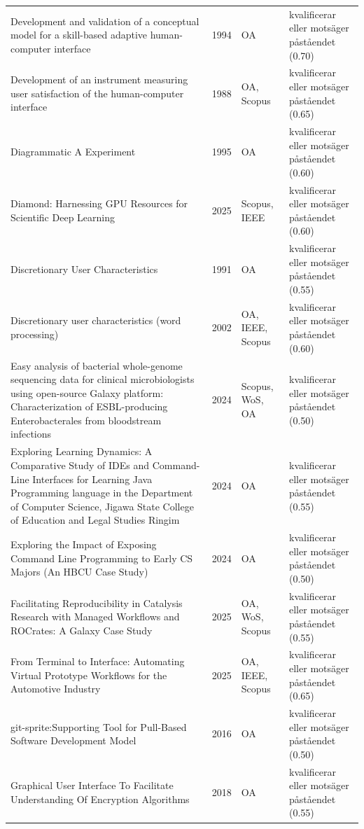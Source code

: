 \begin{longtable}{@{}%
  >{\raggedright\arraybackslash}p{}c%
  >{\raggedright\arraybackslash}p{}%
  >{\raggedright\arraybackslash}p{}@{}}
Development and validation of a conceptual model for a skill-based adaptive human-computer interface & 1994 & OA & kvalificerar eller motsäger påståendet (0.70) \\
Development of an instrument measuring user satisfaction of the human-computer interface & 1988 & OA, Scopus & kvalificerar eller motsäger påståendet (0.65) \\
Diagrammatic A Experiment & 1995 & OA & kvalificerar eller motsäger påståendet (0.60) \\
Diamond: Harnessing GPU Resources for Scientific Deep Learning & 2025 & Scopus, IEEE & kvalificerar eller motsäger påståendet (0.60) \\
Discretionary User Characteristics & 1991 & OA & kvalificerar eller motsäger påståendet (0.55) \\
Discretionary user characteristics (word processing) & 2002 & OA, IEEE, Scopus & kvalificerar eller motsäger påståendet (0.60) \\
Easy analysis of bacterial whole-genome sequencing data for clinical microbiologists using open-source Galaxy platform: Characterization of ESBL-producing Enterobacterales from bloodstream infections & 2024 & Scopus, WoS, OA & kvalificerar eller motsäger påståendet (0.50) \\
Exploring Learning Dynamics: A Comparative Study of IDEs and Command-Line Interfaces for Learning Java Programming language in the Department of Computer Science, Jigawa State College of Education and Legal Studies Ringim & 2024 & OA & kvalificerar eller motsäger påståendet (0.55) \\
Exploring the Impact of Exposing Command Line Programming to Early CS Majors (An HBCU Case Study) & 2024 & OA & kvalificerar eller motsäger påståendet (0.50) \\
Facilitating Reproducibility in Catalysis Research with Managed Workflows and ROCrates: A Galaxy Case Study & 2025 & OA, WoS, Scopus & kvalificerar eller motsäger påståendet (0.55) \\
From Terminal to Interface: Automating Virtual Prototype Workflows for the Automotive Industry & 2025 & OA, IEEE, Scopus & kvalificerar eller motsäger påståendet (0.65) \\
git-sprite:Supporting Tool for Pull-Based Software Development Model & 2016 & OA & kvalificerar eller motsäger påståendet (0.50) \\
Graphical User Interface To Facilitate Understanding Of Encryption Algorithms & 2018 & OA & kvalificerar eller motsäger påståendet (0.55) \\

\end{longtable}
